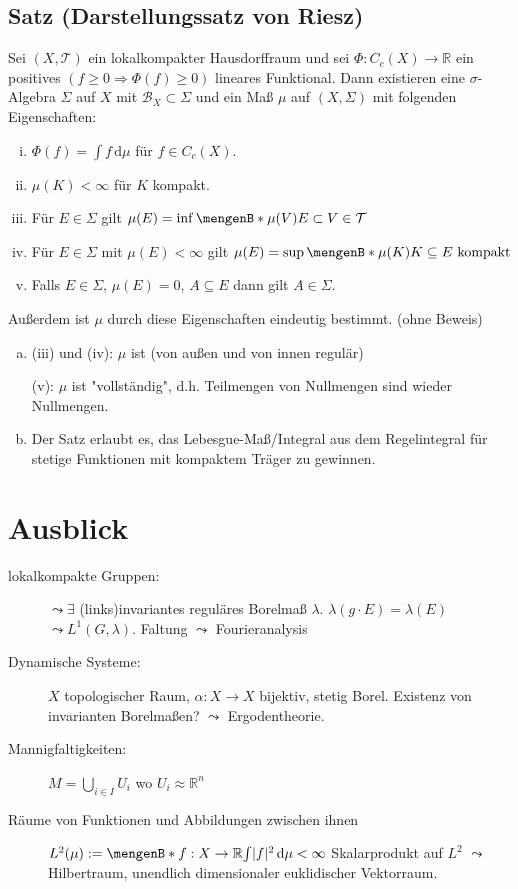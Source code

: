 \subsection{Satz (Darstellungssatz von Riesz)} %
\label{sub:925}
Sei $(X,\mathcal{T})$ ein lokalkompakter Hausdorffraum und sei $\Phi : C_c(X) \to \mathds{R}$ ein positives $(f \ge 0 \Rightarrow \Phi(f)\ge 0)$ lineares Funktional.
Dann existieren eine $\sigma$-Algebra $\Sigma$ auf $X$ mit $\mathcal{B}_X \subset \Sigma$ und ein Maß $\mu$ auf $(X, \Sigma)$ mit folgenden Eigenschaften:
\begin{enumerate}[(i)]
	\item $\Phi(f) = \int\! f  \, \mathrm{d}\mu$ für $f \in C_c(X)$.
	\item $\mu(K)< \infty$ für $K$ kompakt. 
	\item Für $E \in \Sigma$ gilt $\mu(E)= \inf\set[\mu(V)]{E \subset V \in \mathcal{T} } $
	\item Für $E \in \Sigma$ mit $\mu(E)< \infty$ gilt $\mu(E) = \sup \set[\mu(K)]{K \subseteq E \text{ kompakt}} $
	\item Falls $E \in \Sigma$, $\mu(E)=0$, $A \subseteq E$ dann gilt $A \in \Sigma$.
\end{enumerate} 
Außerdem ist $\mu$ durch diese Eigenschaften eindeutig bestimmt. \bewende(ohne Beweis)
\begin{enumerate}[a)]
	\item (iii) und (iv): $\mu$ ist  (von außen und von innen regulär) 
	
	(v): $\mu$ ist "{}vollständig"{}, d.h. Teilmengen von Nullmengen sind wieder Nullmengen.
	\item Der Satz erlaubt es, das Lebesgue-Maß/Integral aus dem Regelintegral für stetige Funktionen mit kompaktem Träger zu gewinnen.
\end{enumerate}
\newpage

\section{Ausblick} %
\label{sec:10}
\begin{description}
	\item[lokalkompakte Gruppen:] $\leadsto \exists$ (links)invariantes reguläres Borelmaß $\lambda$. $\lambda (g \cdot E) = \lambda (E)$ $\leadsto L^1(G,\lambda) $.
	Faltung $ \leadsto$ Fourieranalysis
	\item[Dynamische Systeme:] $X$ topologischer Raum, $\alpha : X \to X$ bijektiv, stetig Borel. Existenz von invarianten Borelmaßen? $\leadsto$ Ergodentheorie.
	\item[Mannigfaltigkeiten:] $M = \bigcup_{i \in I} U_i$ wo $U_i \approx \mathds{R}^n$
	\item[Räume von Funktionen und Abbildungen zwischen ihnen] $L^2(\mu) := \set[f :X \to \mathds{R}]{\int \abs{f}^2  \, \mathrm{d}\mu < \infty } $
	Skalarprodukt auf $L^2$ $\leadsto $ Hilbertraum, unendlich dimensionaler euklidischer Vektorraum.
\end{description}





\cleardoubleoddemptypage
{}
\setcounter{page}{1}
\printindex
\listoffigures

